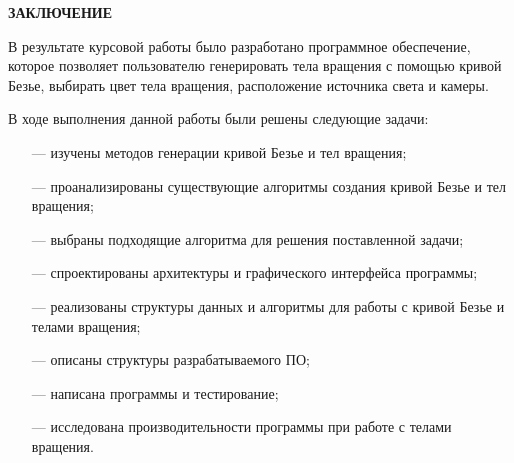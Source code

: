 \begin{center}
    \textbf{ЗАКЛЮЧЕНИЕ}
\end{center}

В результате курсовой работы было разработано программное обеспечение, которое позволяет пользователю генерировать тела вращения с помощью кривой Безье, выбирать цвет тела вращения, расположение источника света и камеры.

В ходе выполнения данной работы были решены следующие задачи:

\begin{itemize}
    \item[---] изучены методов генерации кривой Безье и тел вращения;
    \item[---] проанализированы существующие алгоритмы создания кривой Безье и тел вращения;
    \item[---] выбраны подходящие алгоритма для решения поставленной задачи;
    \item[---] спроектированы архитектуры и графического интерфейса программы;
    \item[---] реализованы структуры данных и алгоритмы для работы с кривой Безье и телами вращения;
    \item[---] описаны структуры разрабатываемого ПО;
    \item[---] написана программы и тестирование;
    \item[---] исследована производительности программы при работе с телами вращения.
\end{itemize}